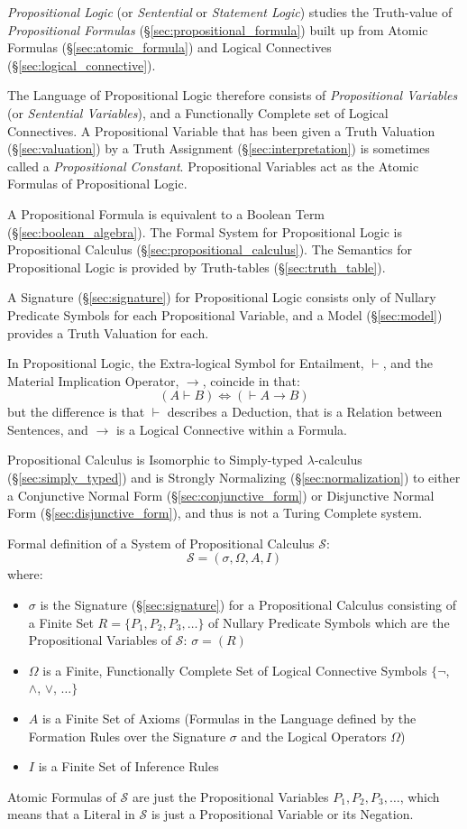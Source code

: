 \emph{Propositional Logic} (or \emph{Sentential} or \emph{Statement
  Logic}) studies the Truth-value of \emph{Propositional Formulas}
(\S\ref{sec:propositional_formula}) built up from Atomic Formulas
(\S\ref{sec:atomic_formula}) and Logical Connectives
(\S\ref{sec:logical_connective}).

The Language of Propositional Logic therefore consists of
\emph{Propositional Variables} (or \emph{Sentential Variables}), and a
Functionally Complete set of Logical Connectives. A Propositional
Variable that has been given a Truth Valuation (\S\ref{sec:valuation})
by a Truth Assignment (\S\ref{sec:interpretation}) is sometimes called
a \emph{Propositional Constant}. Propositional Variables act as the
Atomic Formulas of Propositional Logic.

A Propositional Formula is equivalent to a Boolean Term
(\S\ref{sec:boolean_algebra}). The Formal System for Propositional
Logic is Propositional Calculus (\S\ref{sec:propositional_calculus}).
The Semantics for Propositional Logic is provided by Truth-tables
(\S\ref{sec:truth_table}).

A Signature (\S\ref{sec:signature}) for Propositional Logic consists
only of Nullary Predicate Symbols for each Propositional Variable, and
a Model (\S\ref{sec:model}) provides a Truth Valuation for each.

In Propositional Logic, the Extra-logical Symbol for Entailment,
$\vdash$, and the Material Implication Operator, $\rightarrow$,
coincide in that:
\[
  (A \vdash B) \Leftrightarrow (\vdash A \rightarrow B)
\]
but the difference is that $\vdash$ describes a Deduction, that is a
Relation between Sentences, and $\rightarrow$ is a Logical Connective
within a Formula.

Propositional Calculus is Isomorphic to Simply-typed
$\lambda$-calculus (\S\ref{sec:simply_typed}) and is Strongly
Normalizing (\S\ref{sec:normalization}) to either a Conjunctive Normal
Form (\S\ref{sec:conjunctive_form}) or Disjunctive Normal Form
(\S\ref{sec:disjunctive_form}), and thus is not a Turing Complete
system.

Formal definition of a System of Propositional Calculus $\mathcal{S}$:
\[
    \mathcal{S} = (\sigma, \Omega, A, I)
\]
where:
\begin{itemize}
  \item $\sigma$ is the Signature (\S\ref{sec:signature}) for a
    Propositional Calculus consisting of a Finite Set $R = \{P_1, P_2,
    P_3, \ldots\}$ of Nullary Predicate Symbols which are the
    Propositional Variables of $\mathcal{S}$: $\sigma = (R)$
  \item $\Omega$ is a Finite, Functionally Complete Set of Logical
    Connective Symbols $\{\neg$, $\wedge$, $\vee$, $\ldots\}$
  \item $A$ is a Finite Set of Axioms (Formulas in the Language defined
    by the Formation Rules over the Signature $\sigma$ and the Logical
    Operators $\Omega$)
  \item $I$ is a Finite Set of Inference Rules
\end{itemize}
Atomic Formulas of $\mathcal{S}$ are just the Propositional Variables
$P_1, P_2, P_3, \ldots$, which means that a Literal in $\mathcal{S}$
is just a Propositional Variable or its Negation.

